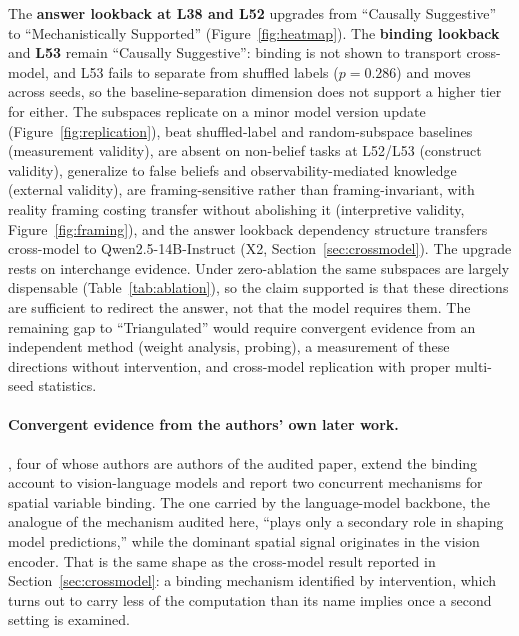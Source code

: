 \documentclass{article}
\begin{document}
The \textbf{answer lookback at L38 and L52} upgrades from ``Causally Suggestive'' to
``Mechanistically Supported'' (Figure~\ref{fig:heatmap}). The \textbf{binding lookback}
and \textbf{L53} remain ``Causally Suggestive'': binding is not shown to transport
cross-model, and L53 fails to separate from shuffled labels ($p = 0.286$) and moves across
seeds, so the baseline-separation dimension does not support a higher tier for either. The subspaces replicate on a minor model version update (Figure~\ref{fig:replication}), beat shuffled-label and random-subspace baselines (measurement validity), are absent on non-belief tasks at L52/L53 (construct validity), generalize to false beliefs and observability-mediated knowledge (external validity), are framing-sensitive rather than framing-invariant, with reality framing costing transfer without abolishing it (interpretive validity, Figure~\ref{fig:framing}), and the answer lookback dependency structure transfers cross-model to Qwen2.5-14B-Instruct (X2, Section~\ref{sec:crossmodel}). The upgrade rests on interchange evidence. Under zero-ablation the same subspaces are largely dispensable (Table~\ref{tab:ablation}), so the claim supported is that these directions are sufficient to redirect the answer, not that the model requires them. The remaining gap to ``Triangulated'' would require convergent evidence from an independent method (weight analysis, probing), a measurement of these directions without intervention, and cross-model replication with proper multi-seed statistics.

\paragraph{Convergent evidence from the authors' own later work.}
\citet{cui2026dual}, four of whose authors are authors of the audited paper, extend the
binding account to vision-language models and report two concurrent mechanisms for spatial
variable binding. The one carried by the language-model backbone, the analogue of the
mechanism audited here, ``plays only a secondary role in shaping model predictions,'' while
the dominant spatial signal originates in the vision encoder. That is the same shape as the
cross-model result reported in Section~\ref{sec:crossmodel}: a binding mechanism identified
by intervention, which turns out to carry less of the computation than its name implies once
a second setting is examined.
\end{document}

